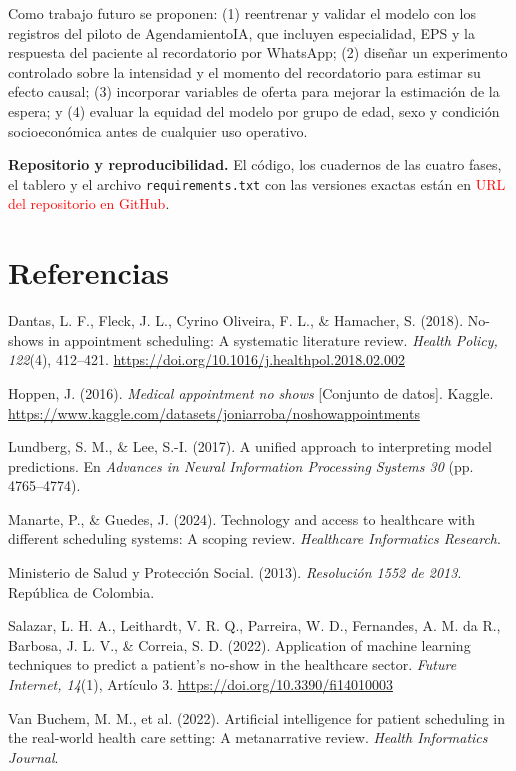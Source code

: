 \documentclass[11pt,letterpaper]{article}
\newcommand{\pend}[1]{\textcolor{red}{#1}}
\begin{document}
Como trabajo futuro se proponen: (1) reentrenar y validar el modelo con los registros del piloto de AgendamientoIA, que incluyen especialidad, EPS y la respuesta del paciente al recordatorio por WhatsApp; (2) diseñar un experimento controlado sobre la intensidad y el momento del recordatorio para estimar su efecto causal; (3) incorporar variables de oferta para mejorar la estimación de la espera; y (4) evaluar la equidad del modelo por grupo de edad, sexo y condición socioeconómica antes de cualquier uso operativo.

\textbf{Repositorio y reproducibilidad.} El código, los cuadernos de las cuatro fases, el tablero y el archivo \texttt{requirements.txt} con las versiones exactas están en \pend{URL del repositorio en GitHub}.

\section*{Referencias}
\setlength{\parindent}{-1.27cm}\setlength{\leftskip}{1.27cm}

Dantas, L. F., Fleck, J. L., Cyrino Oliveira, F. L., \& Hamacher, S. (2018). No-shows in appointment scheduling: A systematic literature review. \emph{Health Policy, 122}(4), 412--421. \url{https://doi.org/10.1016/j.healthpol.2018.02.002}

Hoppen, J. (2016). \emph{Medical appointment no shows} [Conjunto de datos]. Kaggle. \url{https://www.kaggle.com/datasets/joniarroba/noshowappointments}

Lundberg, S. M., \& Lee, S.-I. (2017). A unified approach to interpreting model predictions. En \emph{Advances in Neural Information Processing Systems 30} (pp. 4765--4774).

Manarte, P., \& Guedes, J. (2024). Technology and access to healthcare with different scheduling systems: A scoping review. \emph{Healthcare Informatics Research}.

Ministerio de Salud y Protección Social. (2013). \emph{Resolución 1552 de 2013}. República de Colombia.

Salazar, L. H. A., Leithardt, V. R. Q., Parreira, W. D., Fernandes, A. M. da R., Barbosa, J. L. V., \& Correia, S. D. (2022). Application of machine learning techniques to predict a patient's no-show in the healthcare sector. \emph{Future Internet, 14}(1), Artículo 3. \url{https://doi.org/10.3390/fi14010003}

Van Buchem, M. M., et al. (2022). Artificial intelligence for patient scheduling in the real-world health care setting: A metanarrative review. \emph{Health Informatics Journal}.
\end{document}
